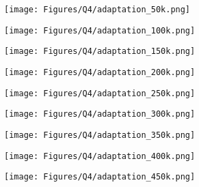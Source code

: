 \begin{figure}[h!]
    \centering
    \begin{subfigure}[t]{0.24\linewidth}
        \centering
        \texttt{[image: Figures/Q4/adaptation\_50k.png]}
        \caption{}
        \label{fig:app_sub_a}
    \end{subfigure}
    \begin{subfigure}[t]{0.24\linewidth}
        \centering
        \texttt{[image: Figures/Q4/adaptation\_100k.png]}
        \caption{}
        \label{fig:app_sub_b}
    \end{subfigure}
    \begin{subfigure}[t]{0.24\linewidth}
        \centering
        \texttt{[image: Figures/Q4/adaptation\_150k.png]}
        \caption{}
        \label{fig:app_sub_c}
    \end{subfigure}  
    \begin{subfigure}[t]{0.24\linewidth}
        \centering
        \texttt{[image: Figures/Q4/adaptation\_200k.png]}
        \caption{}
        \label{fig:app_sub_d}
    \end{subfigure}
    \begin{subfigure}[t]{0.24\linewidth}
        \centering
        \texttt{[image: Figures/Q4/adaptation\_250k.png]}
        \caption{}
        \label{fig:app_sub_e}
    \end{subfigure}  
    \begin{subfigure}[t]{0.24\linewidth}
        \centering
        \texttt{[image: Figures/Q4/adaptation\_300k.png]}
        \caption{}
        \label{fig:app_sub_f}
    \end{subfigure}
    \begin{subfigure}[t]{0.24\linewidth}
        \centering
        \texttt{[image: Figures/Q4/adaptation\_350k.png]}
        \caption{}
        \label{fig:app_sub_g}
    \end{subfigure}  
    \begin{subfigure}[t]{0.24\linewidth}
        \centering
        \texttt{[image: Figures/Q4/adaptation\_400k.png]}
        \caption{}
        \label{fig:app_sub_h}
    \end{subfigure}
    \begin{subfigure}[t]{0.24\linewidth}
        \centering
        \texttt{[image: Figures/Q4/adaptation\_450k.png]}
        \caption{}

\end{subfigure}
\end{figure}

